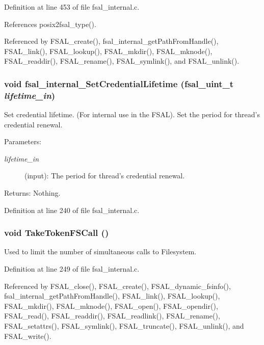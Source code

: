 Definition at line 453 of file fsal\_\-internal.c.

References posix2fsal\_\-type().

Referenced by FSAL\_\-create(), fsal\_\-internal\_\-get\-Path\-From\-Handle(), FSAL\_\-link(), FSAL\_\-lookup(), FSAL\_\-mkdir(), FSAL\_\-mknode(), FSAL\_\-readdir(), FSAL\_\-rename(), FSAL\_\-symlink(), and FSAL\_\-unlink().
\subsubsection{\setlength{\rightskip}{0pt plus 5cm}void fsal\_\-internal\_\-Set\-Credential\-Lifetime (fsal\_\-uint\_\-t {\em lifetime\_\-in})}\label{fsal__internal_8c_a16}


Set credential lifetime. (For internal use in the FSAL). Set the period for thread's credential renewal.

\begin{Desc}
\item[Parameters:]
\begin{description}
\item[{\em lifetime\_\-in}](input): The period for thread's credential renewal.\end{description}
\end{Desc}
\begin{Desc}
\item[Returns:]Nothing. \end{Desc}


Definition at line 240 of file fsal\_\-internal.c.
\subsubsection{\setlength{\rightskip}{0pt plus 5cm}void Take\-Token\-FSCall ()}\label{fsal__internal_8c_a17}


Used to limit the number of simultaneous calls to Filesystem. 

Definition at line 249 of file fsal\_\-internal.c.

Referenced by FSAL\_\-close(), FSAL\_\-create(), FSAL\_\-dynamic\_\-fsinfo(), fsal\_\-internal\_\-get\-Path\-From\-Handle(), FSAL\_\-link(), FSAL\_\-lookup(), FSAL\_\-mkdir(), FSAL\_\-mknode(), FSAL\_\-open(), FSAL\_\-opendir(), FSAL\_\-read(), FSAL\_\-readdir(), FSAL\_\-readlink(), FSAL\_\-rename(), FSAL\_\-setattrs(), FSAL\_\-symlink(), FSAL\_\-truncate(), FSAL\_\-unlink(), and FSAL\_\-write().